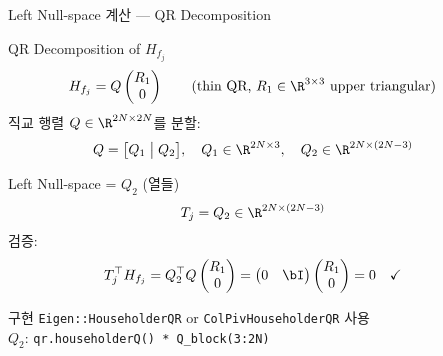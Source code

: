 \begin{frame}[shrink=10]{Left Null-space 계산 — QR Decomposition}
  \begin{block}{QR Decomposition of $H_{f_j}$}
    \begin{align*}
      H_{f_j} &= Q \begin{pmatrix} R_1 \\ 0 \end{pmatrix}
      \qquad \text{(thin QR, } R_1 \in \R^{3\times 3} \text{ upper triangular)}
    \end{align*}
    직교 행렬 $Q \in \R^{2N\times 2N}$를 분할:
    \begin{align*}
      Q &= \bigl[Q_1 \;\big|\; Q_2\bigr], \quad
      Q_1 \in \R^{2N\times 3},\quad Q_2 \in \R^{2N\times(2N-3)}
    \end{align*}
  \end{block}
  \begin{block}{Left Null-space = $Q_2$ (열들)}
    \begin{align*}
      T_j &= Q_2 \in \R^{2N\times(2N-3)}
    \end{align*}
    검증:
    \begin{align*}
      T_j^\top H_{f_j} &= Q_2^\top Q \begin{pmatrix}R_1\\0\end{pmatrix}
      = \begin{pmatrix}0 & \bI\end{pmatrix}\begin{pmatrix}R_1\\0\end{pmatrix} = 0 \quad \checkmark
    \end{align*}
  \end{block}
  \begin{exampleblock}{구현}
    \texttt{Eigen::HouseholderQR} or \texttt{ColPivHouseholderQR} 사용\\
    $Q_2$: \texttt{qr.householderQ() * Q\_block(3:2N)}
  \end{exampleblock}
\end{frame}

